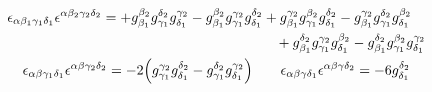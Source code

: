 \begin{gather*}
    \begin{multlined}
        \epsilon_{\alpha\beta_1\gamma_1\delta_1}\epsilon^{\alpha\beta_2\gamma_2\delta_2}
        =
        + g^{\beta_2}_{\beta_1}g^{\delta_2}_{\gamma_1}g^{\gamma_2}_{\delta_1}
        - g^{\beta_2}_{\beta_1}g^{\gamma_2}_{\gamma_1}g^{\delta_2}_{\delta_1}
        + g^{\gamma_2}_{\beta_1}g^{\beta_2}_{\gamma_1}g^{\delta_2}_{\delta_1}
        - g^{\gamma_2}_{\beta_1}g^{\delta_2}_{\gamma_1}g^{\beta_2}_{\delta_1}
        \\
        + g^{\delta_2}_{\beta_1}g^{\gamma_2}_{\gamma_1}g^{\beta_2}_{\delta_1}
        - g^{\delta_2}_{\beta_1}g^{\beta_2}_{\gamma_1}g^{\gamma_2}_{\delta_1}
    \end{multlined}
    \\
    \epsilon_{\alpha\beta\gamma_1\delta_1}\epsilon^{\alpha\beta\gamma_2\delta_2} = -2\qty(g_{\gamma_1}^{\gamma_2}g_{\delta_1}^{\delta_2} - g_{\gamma_1}^{\delta_2}g_{\delta_1}^{\gamma_2})
    \qquad
    \epsilon_{\alpha\beta\gamma\delta_1}\epsilon^{\alpha\beta\gamma\delta_2} = -6g_{\delta_1}^{\delta_2}
\end{gather*}

